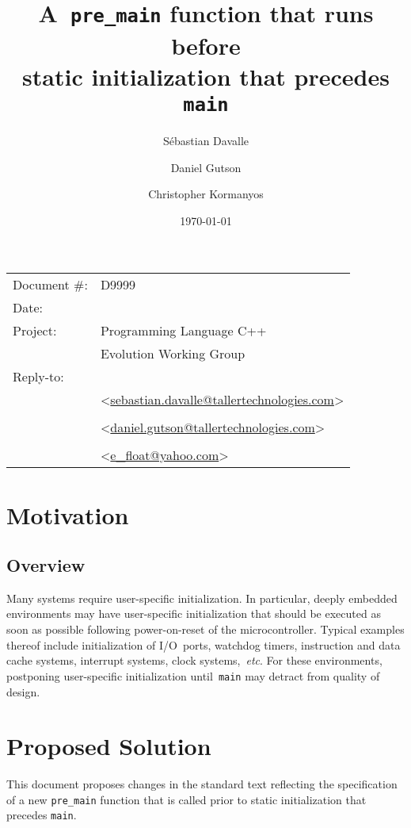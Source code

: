 \documentclass[11pt]{article}
\date{}
\title{\textbf{A~\lstinline{pre_main} function that runs before\\
                static initialization that precedes \lstinline{main}}}
\author{}
\makeatletter
\newcommand{\emailSD}{\href{mailto:sebastian.davalle@tallertechnologies.com}{sebastian.davalle@tallertechnologies.com}}
\newcommand{\emailDG}{\href{mailto:daniel.gutson@tallertechnologies.com}{daniel.gutson@tallertechnologies.com}}
\newcommand{\emailCK}{\href{mailto:e\_float@yahoo.com}{e\_float@yahoo.com}}
\makeatother
\begin{document}
\maketitle\vspace{-2cm}

\begin{flushright}
  \begin{tabular}{ll}
  Document \#:&D9999\\
  Date:       &\date{\today}\\
  Project:    &Programming Language C++\\
              &Evolution Working Group\\
  Reply-to:   &\author{S\'{e}bastian Davalle}\\
              &\textless\emailSD\textgreater\\
              &\author{Daniel Gutson}\\
              &\textless\emailDG\textgreater\\
              &\author{Christopher Kormanyos}\\
              &\textless\emailCK\textgreater\\
  \end{tabular}
\end{flushright}

\section{Motivation}
\subsection*{Overview}
Many systems require user-specific initialization. In particular,
deeply embedded environments may have user-specific initialization
that should be executed as soon as possible following power-on-reset
of the microcontroller.
Typical examples thereof include initialization of
I/O~ports, watchdog timers, instruction and data cache systems,
interrupt systems, clock systems,~\emph{etc}. For these environments,
postponing user-specific initialization until~\lstinline{main}
may detract from quality of design.

\section{Proposed Solution}
This document proposes changes in the standard text reflecting
the specification of a new \lstinline{pre_main} function
that is called prior to static initialization that
precedes \lstinline{main}.
\end{document}
